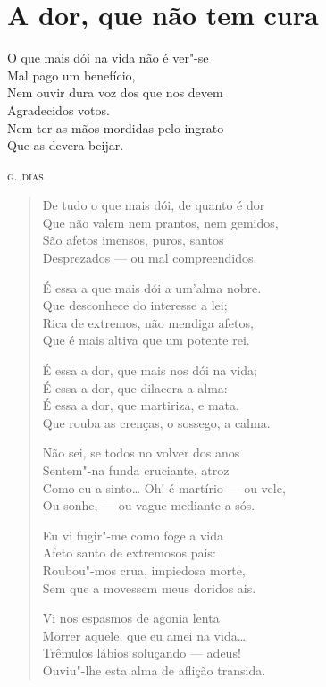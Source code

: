 \chapter{A dor, que não tem cura}

\epigraph{O que mais dói na vida não é ver"-se\\
Mal pago um benefício,\\
Nem ouvir dura voz dos que nos devem\\
Agradecidos votos.\\
Nem ter as mãos mordidas pelo ingrato\\
Que as devera beijar.}{\textsc{g. dias}}

\begin{verse}
De tudo o que mais dói, de quanto é dor\\
Que não valem nem prantos, nem gemidos,\\
São afetos imensos, puros, santos\\
Desprezados --- ou mal compreendidos.

É essa a que mais dói a um'alma nobre.\\
Que desconhece do interesse a lei;\\
Rica de extremos, não mendiga afetos,\\
Que é mais altiva que um potente rei.

É essa a dor, que mais nos dói na vida;\\
É essa a dor, que dilacera a alma:\\
É essa a dor, que martiriza, e mata.\\
Que rouba as crenças, o sossego, a calma.

\pagebreak

Não sei, se todos no volver dos anos\\
Sentem"-na funda cruciante, atroz\\
Como eu a sinto\ldots{} Oh! é martírio --- ou vele,\\
Ou sonhe, --- ou vague mediante a sós.

Eu vi fugir"-me como foge a vida\\
Afeto santo de extremosos pais:\\
Roubou"-mos crua, impiedosa morte,\\
Sem que a movessem meus doridos ais.

Vi nos espasmos de agonia lenta\\
Morrer aquele, que eu amei na vida\ldots{}\\
Trêmulos lábios soluçando --- adeus!\\
Ouviu"-lhe esta alma de aflição transida.


\end{verse}
